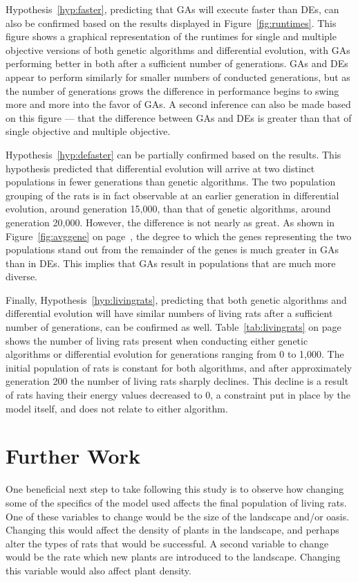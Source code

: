 \documentclass{sig-alternate}
\begin{document}
Hypothesis~\ref{hyp:faster}, predicting that GAs will execute faster than DEs, can also be confirmed based on the results displayed in Figure~\ref{fig:runtimes}.  This figure shows a graphical representation of the runtimes for single and multiple objective versions of both genetic algorithms and differential evolution, with GAs performing better in both after a sufficient number of generations.  GAs and DEs appear to perform similarly for smaller numbers of conducted generations, but as the number of generations grows the difference in performance begins to swing more and more into the favor of GAs.  A second inference can also be made based on this figure --- that the difference between GAs and DEs is greater than that of single objective and multiple objective.

Hypothesis~\ref{hyp:defaster} can be partially confirmed based on the results.  This hypothesis predicted that differential evolution will arrive at two distinct populations in fewer generations than genetic algorithms.  The two population grouping of the rats is in fact observable at an earlier generation in differential evolution, around generation 15,000, than that of genetic algorithms, around generation 20,000.  However, the difference is not nearly as great.  As shown in Figure~\ref{fig:avggene} on page~\pageref{fig:avggene}, the degree to which the genes representing the two populations stand out from the remainder of the genes is much greater in GAs than in DEs.  This implies that GAs result in populations that are much more diverse.

Finally, Hypothesis~\ref{hyp:livingrats}, predicting that both genetic algorithms and differential evolution will have similar numbers of living rats after a sufficient number of generations, can be confirmed as well.  Table~\ref{tab:livingrats} on page~\pageref{tab:livingrats} shows the number of living rats present when conducting either genetic algorithms or differential evolution for generations ranging from 0 to 1,000.  The initial population of rats is constant for both algorithms, and after approximately generation 200 the number of living rats sharply declines.  This decline is a result of rats having their energy values decreased to 0, a constraint put in place by the model itself, and does not relate to either algorithm.

\section{Further Work}
One beneficial next step to take following this study is to observe how changing some of the specifics of the model used affects the final population of living rats.  One of these variables to change would be the size of the landscape and/or oasis.  Changing this would affect the density of plants in the landscape, and perhaps alter the types of rats that would be successful.  A second variable to change would be the rate which new plants are introduced to the landscape.  Changing this variable would also affect plant density.
\end{document}
